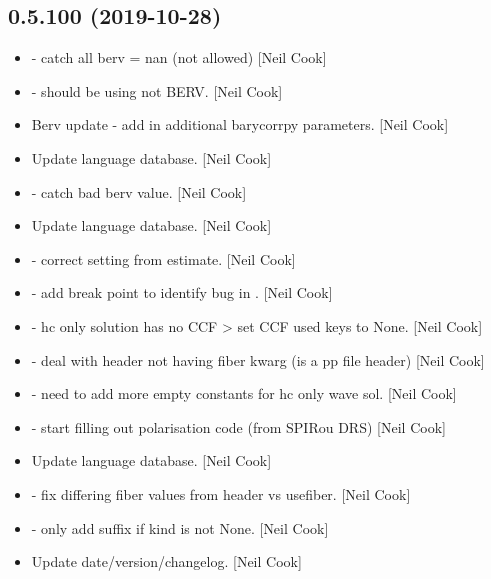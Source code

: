 \documentclass[a4paper,10pt,english]{report}
\begin{document}
\subsection{0.5.100 (2019-10-28)}
\label{\detokenize{misc/changelog:id43}}\begin{itemize}
\item {} 
 - catch all berv = nan (not allowed) {[}Neil
Cook{]}

\item {} 
 - should be using  not BERV. {[}Neil
Cook{]}

\item {} 
Berv update - add in additional barycorrpy parameters. {[}Neil Cook{]}

\item {} 
Update language database. {[}Neil Cook{]}

\item {} 
 - catch bad berv value. {[}Neil Cook{]}

\item {} 
Update language database. {[}Neil Cook{]}

\item {} 
 - correct setting  from estimate.
{[}Neil Cook{]}

\item {} 
 - add break point to identify bug in
. {[}Neil Cook{]}

\item {} 
 - hc only solution has no CCF \textendash{}\textgreater{} set CCF used
keys to None. {[}Neil Cook{]}

\item {} 
 - deal with header not having fiber kwarg (is a
pp file header) {[}Neil Cook{]}

\item {} 
 - need to add more empty constants for hc only
wave sol. {[}Neil Cook{]}

\item {} 
 - start filling out polarisation code (from SPIRou
DRS) {[}Neil Cook{]}

\item {} 
Update language database. {[}Neil Cook{]}

\item {} 
 - fix differing fiber values from header vs
usefiber. {[}Neil Cook{]}

\item {} 
 - only add suffix if kind is not None. {[}Neil Cook{]}

\item {} 
Update date/version/changelog. {[}Neil Cook{]}

\end{itemize}
\end{document}
